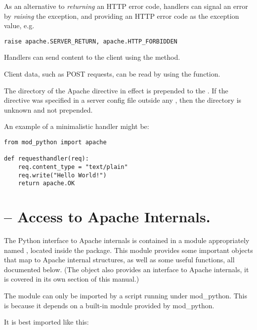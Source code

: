 As an alternative to \emph{returning} an HTTP error code, handlers can
signal an error by \emph{raising} the 
exception, and providing an HTTP error code as the exception value,
e.g.

\begin{verbatim}
raise apache.SERVER_RETURN, apache.HTTP_FORBIDDEN
\end{verbatim}
              
Handlers can send content to the client using the 
method. 

Client data, such as POST requests, can be read by using the
 function.

 The directory of the Apache  
directive in effect is prepended to the . If the
directive was specified in a server config file outside any
, then the directory is unknown and not prepended.

An example of a minimalistic handler might be: 

\begin{verbatim}
from mod_python import apache

def requesthandler(req):
    req.content_type = "text/plain"
    req.write("Hello World!")
    return apache.OK
\end{verbatim}

\section{ -- Access to Apache Internals.}

The Python interface to Apache internals is contained in a module
appropriately named , located inside the
 package. This module provides some important
objects that map to Apache internal structures, as well as some useful
functions, all documented below. (The  object also
provides an interface to Apache internals, it is covered in its own
section of this manual.)

 The  module can only be
imported by a script running under mod_python. This is because it
depends on a built-in module  provided by
mod_python.

It is best imported like this:

